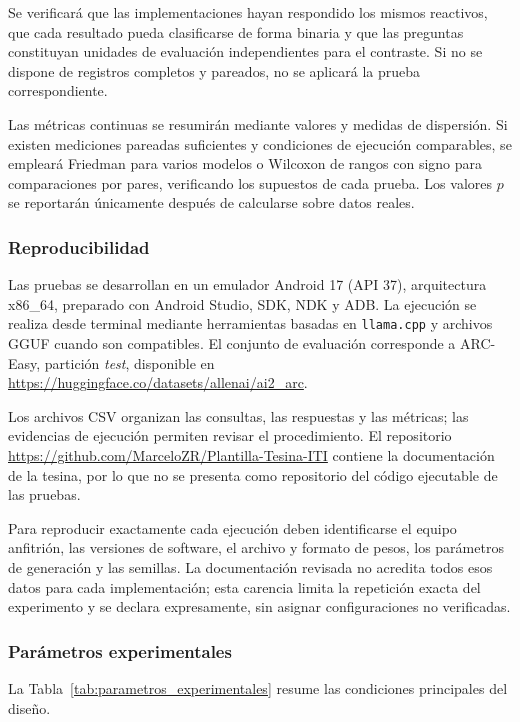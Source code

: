 Se verificará que las implementaciones hayan respondido los mismos reactivos, que cada resultado pueda clasificarse de forma binaria y que las preguntas constituyan unidades de evaluación independientes para el contraste. Si no se dispone de registros completos y pareados, no se aplicará la prueba correspondiente.

Las métricas continuas se resumirán mediante valores y medidas de dispersión. Si existen mediciones pareadas suficientes y condiciones de ejecución comparables, se empleará Friedman para varios modelos o Wilcoxon de rangos con signo para comparaciones por pares, verificando los supuestos de cada prueba. Los valores $p$ se reportarán únicamente después de calcularse sobre datos reales.

\subsubsection{Reproducibilidad}

Las pruebas se desarrollan en un emulador Android 17 (API 37), arquitectura x86\_64, preparado con Android Studio, SDK, NDK y ADB. La ejecución se realiza desde terminal mediante herramientas basadas en \texttt{llama.cpp} y archivos GGUF cuando son compatibles. El conjunto de evaluación corresponde a ARC-Easy, partición \textit{test}, disponible en \url{https://huggingface.co/datasets/allenai/ai2_arc}.

Los archivos CSV organizan las consultas, las respuestas y las métricas; las evidencias de ejecución permiten revisar el procedimiento. El repositorio \url{https://github.com/MarceloZR/Plantilla-Tesina-ITI} contiene la documentación de la tesina, por lo que no se presenta como repositorio del código ejecutable de las pruebas.

Para reproducir exactamente cada ejecución deben identificarse el equipo anfitrión, las versiones de software, el archivo y formato de pesos, los parámetros de generación y las semillas. La documentación revisada no acredita todos esos datos para cada implementación; esta carencia limita la repetición exacta del experimento y se declara expresamente, sin asignar configuraciones no verificadas.

\subsubsection{Parámetros experimentales}

La Tabla~\ref{tab:parametros_experimentales} resume las condiciones principales del diseño.

